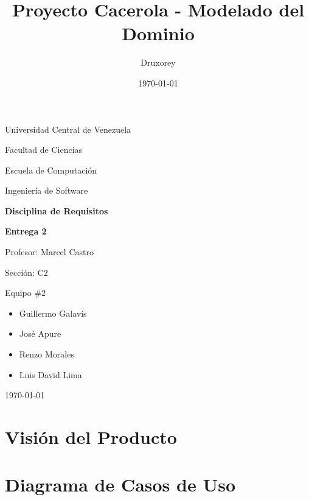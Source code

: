 \documentclass[12pt]{article}
\title{Proyecto Cacerola - Modelado del Dominio} %
\author{Druxorey} %
\date{\today} %
\begin{document}
\begin{titlepage}
	\centering
	\vspace{1cm}
	{\large {Universidad Central de Venezuela}\par}
	{\large {Facultad de Ciencias}\par}
	{\large {Escuela de Computación}\par}
	{\large {Ingeniería de Software}\par}
	\vspace{6cm}
	{\LARGE \textbf{Disciplina de Requisitos}\par}
	\vspace{0.25cm}
	{\Large \textbf{Entrega 2}\par}
	\vfill
	\begin{flushleft}
		{\large Profesor: Marcel Castro\par\vspace{-0.5em}}
		{\large Sección: C2\par\vspace{-0.5em}}
		{\large Equipo \#2\par\vspace{-1em}}
		\begin{itemize}
			\item Guillermo Galavís\vspace{-0.5em}
			\item José Apure\vspace{-0.5em}
			\item Renzo Morales\vspace{-0.5em}
			\item Luis David Lima\vspace{-0.5em}
		\end{itemize}
	\end{flushleft}
	\vspace{0.5cm}
	\centering
	{\large \today\par}
\end{titlepage}

\section{Visión del Producto}

\vspace{1cm}

\begin{center}
\end{center}

\pagebreak

\section{Diagrama de Casos de Uso}
\end{document}

